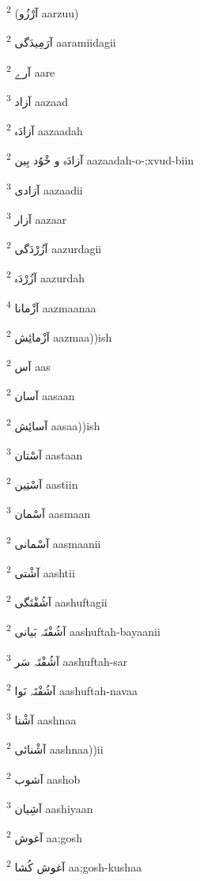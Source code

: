 \documentclass[12pt]{article}
\begin{document}
\begin{multicols}{5}
{\ur آرْزُو)}   \textsuperscript{2} aarzuu)

{\ur آرَمِیدَگی}   \textsuperscript{2} aaramiidagii

{\ur آرے}   \textsuperscript{2} aare

{\ur آزاد}   \textsuperscript{3} aazaad

{\ur آزادَہ}   \textsuperscript{2} aazaadah

{\ur آزادَہ و خْوُد بِین}   \textsuperscript{2} aazaadah-o-;xvud-biin

{\ur آزادی}   \textsuperscript{3} aazaadii

{\ur آزار}   \textsuperscript{3} aazaar

{\ur آزُرْدَگی}   \textsuperscript{2} aazurdagii

{\ur آزُرْدَہ}   \textsuperscript{2} aazurdah

{\ur آزْمانا}   \textsuperscript{4} aazmaanaa

{\ur آزْمائِش}   \textsuperscript{2} aazmaa))ish

{\ur آس}   \textsuperscript{2} aas

{\ur آسان}   \textsuperscript{2} aasaan

{\ur آسائِش}   \textsuperscript{2} aasaa))ish

{\ur آسْتان}   \textsuperscript{3} aastaan

{\ur آسْتِین}   \textsuperscript{2} aastiin

{\ur آسْمان}   \textsuperscript{3} aasmaan

{\ur آسْمانی}   \textsuperscript{2} aasmaanii

{\ur آشْتی}   \textsuperscript{2} aashtii

{\ur آشُفْتَگی}   \textsuperscript{2} aashuftagii

{\ur آشُفْتَہ بَیانی}   \textsuperscript{2} aashuftah-bayaanii

{\ur آشُفْتَہ سَر}   \textsuperscript{3} aashuftah-sar

{\ur آشُفْتَہ نَوا}   \textsuperscript{2} aashuftah-navaa

{\ur آشْنا}   \textsuperscript{3} aashnaa

{\ur آشْنائی}   \textsuperscript{2} aashnaa))ii

{\ur آشوب}   \textsuperscript{2} aashob

{\ur آشِیان}   \textsuperscript{3} aashiyaan

{\ur آغوش}   \textsuperscript{2} aa;gosh

{\ur آغوش کُشا}   \textsuperscript{2} aa;gosh-kushaa


\end{multicols}
\end{document}
